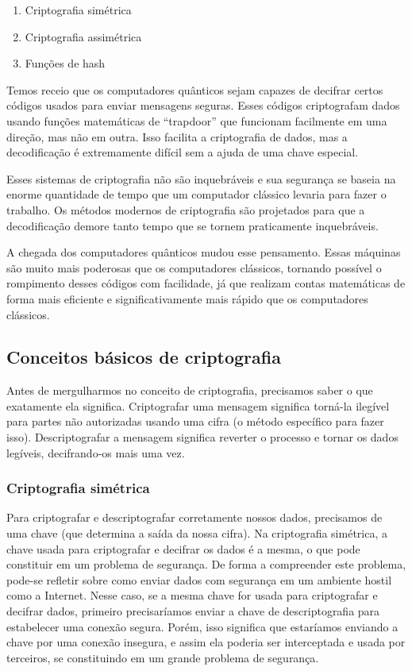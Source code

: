 \begin{enumerate}
  \item Criptografia simétrica
  \item Criptografia assimétrica
  \item Funções de hash
\end{enumerate}

Temos receio que os computadores quânticos sejam capazes de decifrar certos códigos usados para enviar mensagens seguras. Esses códigos criptografam dados usando funções matemáticas de ``trapdoor'' que funcionam facilmente em uma direção, mas não em outra. Isso facilita a criptografia de dados, mas a decodificação é extremamente difícil sem a ajuda de uma chave especial.

Esses sistemas de criptografia não são inquebráveis e sua segurança se baseia na enorme quantidade de tempo que um computador clássico levaria para fazer o trabalho. Os métodos modernos de criptografia são projetados para que a decodificação demore tanto tempo que se tornem praticamente inquebráveis.

A chegada dos computadores quânticos mudou esse pensamento. Essas máquinas são muito mais poderosas que os computadores clássicos, tornando possível o rompimento desses códigos com facilidade, já que realizam contas matemáticas de forma mais eficiente e significativamente mais rápido que os computadores clássicos.

\subsection{Conceitos básicos de criptografia}
Antes de mergulharmos no conceito de criptografia, precisamos saber o que exatamente ela significa. Criptografar uma mensagem significa torná-la ilegível para partes não autorizadas usando uma cifra (o método específico para fazer isso). Descriptografar a mensagem significa reverter o processo e tornar os dados legíveis, decifrando-os mais uma vez.

\subsubsection{Criptografia simétrica}
Para criptografar e descriptografar corretamente nossos dados, precisamos de uma chave (que determina a saída da nossa cifra).  Na criptografia simétrica,  a chave usada para criptografar e decifrar os dados é a mesma, o que pode constituir em um problema de segurança. De forma a compreender este problema, pode-se refletir sobre como enviar dados com segurança em um ambiente hostil como a Internet. Nesse caso, se a mesma chave for usada para criptografar e decifrar dados, primeiro precisaríamos  enviar  a  chave  de  descriptografia  para  estabelecer  uma  conexão segura.  Porém, isso significa que estaríamos enviando a chave por uma conexão insegura, e assim ela poderia ser interceptada e usada por terceiros, se constituindo em um grande problema de segurança. 


